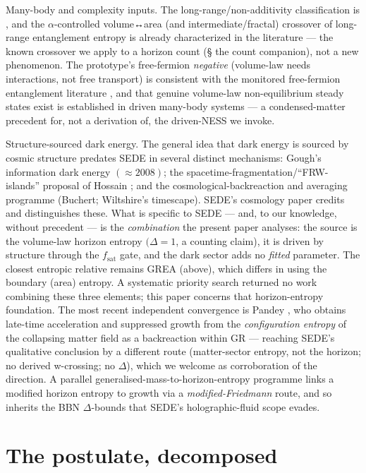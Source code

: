 \documentclass[aps,prd,preprint,nofootinbib,superscriptaddress]{revtex4-2}
\begin{document}
Many-body and complexity inputs. The long-range/non-additivity
classification is \cite{Campa:2009jxa}, and the \(\alpha\)-controlled
volume↔area (and intermediate/fractal) crossover of long-range
entanglement entropy is already characterized in the literature
\cite{Vitagliano:2010db, Solfanelli:2023vav, Chakraborty:2023mrw, J:2025waa}
--- the known crossover we apply to a horizon count (§ the count
companion), not a new phenomenon. The prototype's free-fermion
\emph{negative} (volume-law needs interactions, not free transport) is
consistent with the monitored free-fermion entanglement literature
\cite{Fisher:2022qey}, and that genuine volume-law non-equilibrium
steady states exist is established in driven many-body systems
\cite{Ippoliti:2021fjy} --- a condensed-matter precedent for, not a
derivation of, the driven-NESS we invoke.

Structure-sourced dark energy. The general idea that dark energy is
sourced by cosmic structure predates SEDE in several distinct
mechanisms: Gough's information dark energy \((\approx 2008)\); the
spacetime-fragmentation/``FRW-islands'' proposal of Hossain
\cite{Hossain:2007ma}; and the cosmological-backreaction and averaging
programme (Buchert; Wiltshire's timescape). SEDE's cosmology paper
credits and distinguishes these. What is specific to SEDE --- and, to
our knowledge, without precedent --- is the \emph{combination} the
present paper analyses: the source is the volume-law horizon entropy
\((\Delta  = 1\), a counting claim), it is driven by structure through
the \(f_{\mathrm{sat}}\) gate, and the dark sector adds no \emph{fitted}
parameter. The closest entropic relative remains GREA (above), which
differs in using the boundary (area) entropy. A systematic priority
search returned no work combining these three elements; this paper
concerns that horizon-entropy foundation. The most recent independent
convergence is Pandey \cite{Pandey:2026}, who obtains late-time
acceleration and suppressed growth from the \emph{configuration entropy}
of the collapsing matter field as a backreaction within GR --- reaching
SEDE's qualitative conclusion by a different route (matter-sector
entropy, not the horizon; no derived w-crossing; no \(\Delta\)), which
we welcome as corroboration of the direction. A parallel
generalised-mass-to-horizon-entropy programme
\cite{Shameeem:2026, Mondal:2026} links a modified horizon entropy to
growth via a \emph{modified-Friedmann} route, and so inherits the BBN
\(\Delta\)-bounds that SEDE's holographic-fluid scope evades.

\section{The postulate, decomposed}\label{sec-2}
\end{document}
